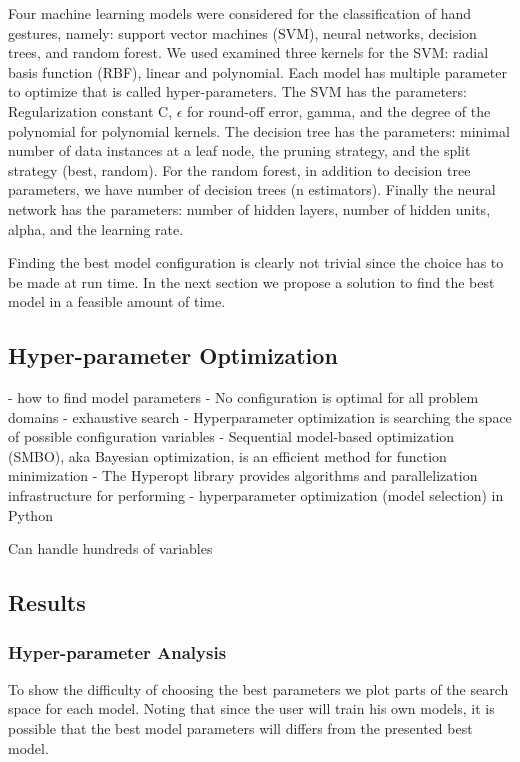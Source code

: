 \documentclass{article}
\begin{document}
Four machine learning models were considered for the classification of hand gestures, namely: support vector machines (SVM), neural networks, decision trees, and random forest. We used examined three kernels for the SVM: radial basis function (RBF), linear and polynomial.
Each model has multiple parameter to optimize that is called hyper-parameters. The SVM has the parameters: Regularization constant C, $\epsilon$ for round-off error, gamma, and the degree of the polynomial for polynomial kernels. The decision tree has the parameters: minimal number of data instances at a leaf node, the pruning strategy, and the split strategy (best, random). For the random forest, in addition to decision tree parameters, we have number of decision trees (n estimators). Finally the neural network has the parameters:
number of hidden layers, number of hidden units, alpha, and the learning rate.

Finding the best model configuration is clearly not trivial since the choice has to be made at run time. In the next section we propose a solution to find the best model in a feasible amount of time.

\subsection{Hyper-parameter Optimization}
- how to find model parameters
- No configuration is optimal for all problem domains
- exhaustive search
- Hyperparameter optimization is searching the space of possible configuration variables
- Sequential model-based optimization (SMBO), aka Bayesian optimization, is an efficient method for function minimization
- The Hyperopt library provides algorithms and parallelization infrastructure for performing - hyperparameter optimization (model selection) in Python

Can handle hundreds of variables


\subsection{Results}


\subsubsection{Hyper-parameter Analysis}
To show the difficulty of choosing the best parameters we plot parts of the search space for each model. Noting that since the user will train his own models, it is possible that the best model parameters will differs from the presented best model.
\end{document}
